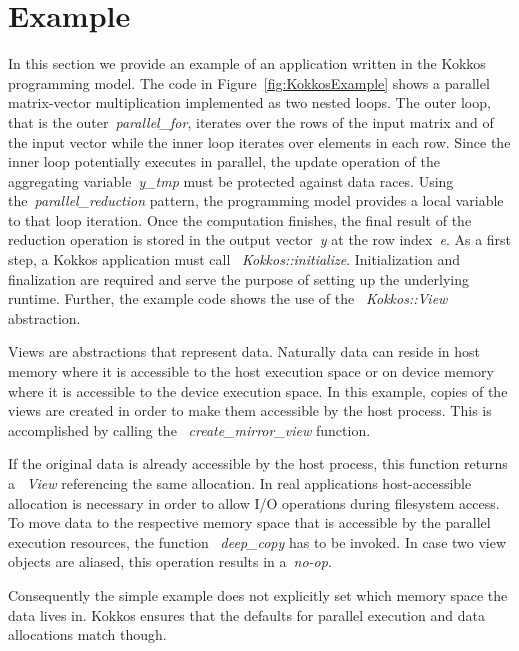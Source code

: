 \section{Example}\label{chap:kokkosExample}

In this section we provide an example of an application written in the Kokkos programming model. The code in Figure~\ref{fig:KokkosExample} shows a parallel matrix-vector multiplication implemented as two nested loops. The outer loop, that is the outer~\emph{parallel\_for}, iterates over the rows of the input matrix and of the input vector while the inner loop iterates over elements in each row. Since the inner loop potentially executes in parallel, the update operation of the aggregating variable~\emph{y\_tmp} must be protected against data races. Using the~\emph{parallel\_reduction} pattern, the programming model provides a local variable to that loop iteration. Once the computation finishes, the final result of the reduction operation is stored in the output vector~\emph{y} at the row index~\emph{e}.  
As a first step, a Kokkos application must call ~\emph{Kokkos::initialize}. Initialization and finalization are required and serve the purpose of setting up the underlying runtime. 
Further, the example code shows the use of the ~\emph{Kokkos::View} abstraction. 

Views are abstractions that represent data. Naturally data can reside in host memory where it is accessible to the host execution space or on device memory where it is accessible to the device execution space. In this example, copies of the views are created in order to make them accessible by the host process. This is accomplished by calling the ~\emph{create\_mirror\_view} function.

If the original data is already accessible by the host process, this function returns a ~\emph{View} referencing the same allocation. In real applications host-accessible allocation is necessary in order to allow I/O operations during filesystem access. To move data to the respective memory space that is accessible by the parallel execution resources, the function ~\emph{deep\_copy} has to be invoked. In case two view objects are aliased, this operation results in a~\emph{no-op}.

Consequently the simple example does not explicitly set which memory space the data lives in.
Kokkos ensures that the defaults for parallel execution and data allocations match though. 

